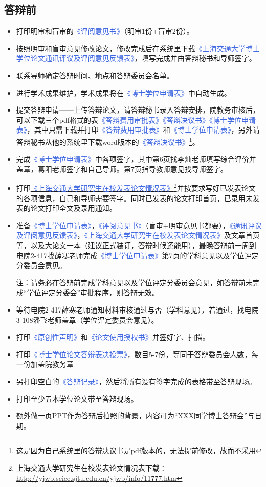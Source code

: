 \documentclass[a4paper, 12pt]{ctexart}
\newcommand{\form}[1]{\textcolor{RoyalBlue}{《#1》}}
\begin{document}
\hypertarget{dbq}{\subsection{答辩前}}
\begin{itemize}
    \item 打印明审和盲审的\form{评阅意见书}（明审1份+盲审2份）。
    \item 按照明审和盲审意见修改论文，修改完成后在系统里下载\form{上海交通大学博士学位论文通讯评议及评阅意见反馈表}，填写完成并由答辩秘书和导师签字。
    \item 联系导师确定答辩时间、地点和答辩委员会名单。
    \item 进行学术成果维护，学术成果将在\form{博士学位申请表}中自动生成。
    \item 提交答辩申请——上传答辩论文，请答辩秘书录入答辩安排，院教务审核后，可以下载三个pdf格式的表\form{答辩费用审批表}\form{答辩决议书}\form{博士学位申请表}，其中只需下载并打印\form{答辩费用审批表}和\form{博士学位申请表}，另外请答辩秘书从他的系统里下载word版本的\form{答辩决议书}\footnote{这是因为自己系统里的答辩决议书是pdf版本的，无法提前修改，故而不采用}。
    \item 完成\form{博士学位申请表}中各项签字，其中第6页找李灿老师填写综合评价并盖章，葛阳老师签字和自己导师。第7页指导教师意见找导师签字。
    \item 打印\href{http://yjwb.seiee.sjtu.edu.cn/yjwb/info/11777.htm}{\form{上海交通大学研究生在校发表论文情况表}}\footnote{上海交通大学研究生在校发表论文情况表下载：\url{http://yjwb.seiee.sjtu.edu.cn/yjwb/info/11777.htm}}并按要求写好已发表论文的各项信息，自己和导师需要签字。同时已发表的论文打印首页，已录用未发表的论文打印全文及录用通知。
    \item 准备\form{博士学位申请表}，\form{评阅意见书}（盲审+明审意见书都要），\form{通讯评议及评阅意见反馈表}，\form{上海交通大学研究生在校发表论文情况表}及文章首页等，以及大论文一本（建议正式装订，答辩时候还能用），最晚答辩前一周到电院2-417找薛寒老师完成\form{博士学位申请表}第7页的学科意见以及学位评定分委员会意见。
    
    注：请务必在答辩前完成学科意见以及学位评定分委员会意见，如答辩前未完成“学位评定分委会”审批程序，则答辩无效。
    
    \item 等待电院2-417薛寒老师通知材料审核通过与否（学科意见），若通过，找电院3-108潘飞老师盖章（学位评定委员会意见）。
    
    \item 打印\form{原创性声明}和\form{论文使用授权书}并签好字、扫描。
    \item 打印\form{博士学位论文答辩表决投票}，数目5-7份，等同于答辩委员会人数，每一份加盖院教务章%
    \item 另打印空白的\form{答辩记录}，然后将所有没有签字完成的表格带至答辩现场。
    \item 打印至少五本学位论文带至答辩现场。
    \item 额外做一页PPT作为答辩后拍照的背景，内容可为“XXX同学博士答辩会”与日期。
    
\end{itemize}
\end{document}
